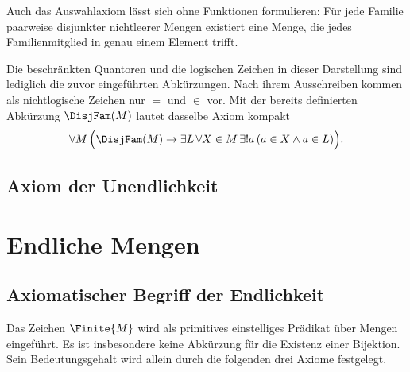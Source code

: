 \documentclass[main.tex]{subfiles}
\begin{document}
Auch das Auswahlaxiom lässt sich ohne Funktionen formulieren: Für jede
Familie paarweise disjunkter nichtleerer Mengen existiert eine Menge, die
jedes Familienmitglied in genau einem Element trifft.


Die beschränkten Quantoren und die logischen Zeichen in dieser Darstellung
sind lediglich die zuvor eingeführten Abkürzungen. Nach ihrem Ausschreiben
kommen als nichtlogische Zeichen nur \(=\) und \(\in\) vor. Mit der bereits
definierten Abkürzung \(\DisjFam(M)\) lautet dasselbe Axiom kompakt
\[
  \forall M\,\Bigl(
    \DisjFam(M)\rightarrow
    \exists L\,\forall X\in M\,\exists!a\,
    (a\in X\land a\in L)
  \Bigr).
\]

\section{Axiom der Unendlichkeit}


\chapter{Endliche Mengen}

\section{Axiomatischer Begriff der Endlichkeit}

Das Zeichen \(\Finite{M}\) wird als primitives einstelliges Prädikat über
Mengen eingeführt. Es ist insbesondere keine Abkürzung für die Existenz einer
Bijektion. Sein Bedeutungsgehalt wird allein durch die folgenden drei Axiome
festgelegt.



\end{document}
